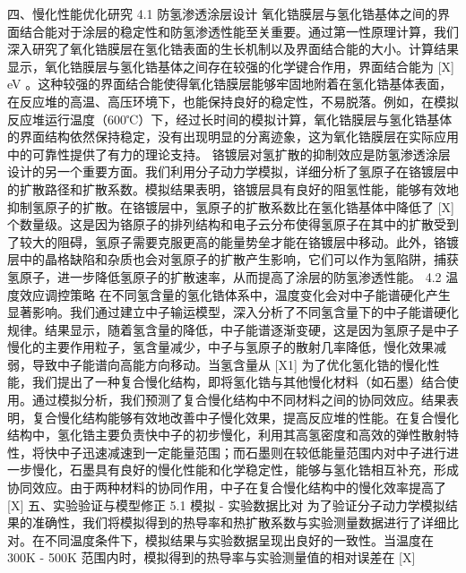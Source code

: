 四、慢化性能优化研究
4.1 防氢渗透涂层设计
氧化锆膜层与氢化锆基体之间的界面结合能对于涂层的稳定性和防氢渗透性能至关重要。通过第一性原理计算，我们深入研究了氧化锆膜层在氢化锆表面的生长机制以及界面结合能的大小。计算结果显示，氧化锆膜层与氢化锆基体之间存在较强的化学键合作用，界面结合能为 [X] eV 。这种较强的界面结合能使得氧化锆膜层能够牢固地附着在氢化锆基体表面，在反应堆的高温、高压环境下，也能保持良好的稳定性，不易脱落。例如，在模拟反应堆运行温度（600℃）下，经过长时间的模拟计算，氧化锆膜层与氢化锆基体的界面结构依然保持稳定，没有出现明显的分离迹象，这为氧化锆膜层在实际应用中的可靠性提供了有力的理论支持。
铬镀层对氢扩散的抑制效应是防氢渗透涂层设计的另一个重要方面。我们利用分子动力学模拟，详细分析了氢原子在铬镀层中的扩散路径和扩散系数。模拟结果表明，铬镀层具有良好的阻氢性能，能够有效地抑制氢原子的扩散。在铬镀层中，氢原子的扩散系数比在氢化锆基体中降低了 [X] 个数量级。这是因为铬原子的排列结构和电子云分布使得氢原子在其中的扩散受到了较大的阻碍，氢原子需要克服更高的能量势垒才能在铬镀层中移动。此外，铬镀层中的晶格缺陷和杂质也会对氢原子的扩散产生影响，它们可以作为氢陷阱，捕获氢原子，进一步降低氢原子的扩散速率，从而提高了涂层的防氢渗透性能。
4.2 温度效应调控策略
在不同氢含量的氢化锆体系中，温度变化会对中子能谱硬化产生显著影响。我们通过建立中子输运模型，深入分析了不同氢含量下的中子能谱硬化规律。结果显示，随着氢含量的降低，中子能谱逐渐变硬，这是因为氢原子是中子慢化的主要作用粒子，氢含量减少，中子与氢原子的散射几率降低，慢化效果减弱，导致中子能谱向高能方向移动。当氢含量从 [X1]%
为了优化氢化锆的慢化性能，我们提出了一种复合慢化结构，即将氢化锆与其他慢化材料（如石墨）结合使用。通过模拟分析，我们预测了复合慢化结构中不同材料之间的协同效应。结果表明，复合慢化结构能够有效地改善中子慢化效果，提高反应堆的性能。在复合慢化结构中，氢化锆主要负责快中子的初步慢化，利用其高氢密度和高效的弹性散射特性，将快中子迅速减速到一定能量范围；而石墨则在较低能量范围内对中子进行进一步慢化，石墨具有良好的慢化性能和化学稳定性，能够与氢化锆相互补充，形成协同效应。由于两种材料的协同作用，中子在复合慢化结构中的慢化效率提高了 [X]%
五、实验验证与模型修正
5.1 模拟 - 实验数据比对
为了验证分子动力学模拟结果的准确性，我们将模拟得到的热导率和热扩散系数与实验测量数据进行了详细比对。在不同温度条件下，模拟结果与实验数据呈现出良好的一致性。当温度在 300K - 500K 范围内时，模拟得到的热导率与实验测量值的相对误差在 [X]%
